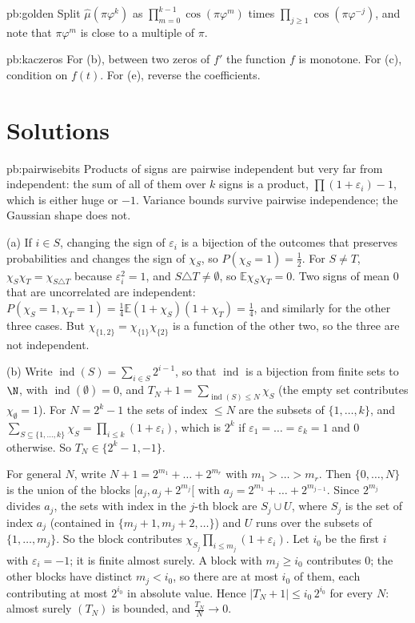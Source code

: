 \begin{hint}{pb:golden}
Split $\hat\mu(\pi\varphi^k)$ as $\prod_{m=0}^{k-1}\cos(\pi\varphi^m)$ times $\prod_{j\ge1}\cos(\pi\varphi^{-j})$, and note that $\pi\varphi^m$ is close to a multiple of $\pi$.
\end{hint}

\begin{hint}{pb:kaczeros}
For (b), between two zeros of $f'$ the function $f$ is monotone. For (c), condition on $f(t)$. For (e), reverse the coefficients.
\end{hint}

\section*{Solutions}

\begin{solution}{pb:pairwisebits}
\idea Products of signs are pairwise independent but very far from independent: the sum of all of them over $k$ signs is a product, $\prod(1+\varepsilon_i)-1$,
which is either huge or $-1$. Variance bounds survive pairwise independence; the Gaussian shape does not.

\writeup (a) If $i\in S$, changing the sign of $\varepsilon_i$ is a bijection of the outcomes that preserves probabilities and changes the sign of $\chi_S$, so
$P(\chi_S=1)=\frac12$. For $S\ne T$, $\chi_S\chi_T=\chi_{S\triangle T}$ because $\varepsilon_i^2=1$, and $S\triangle T\ne\emptyset$, so $\mathbb E\chi_S\chi_T=0$. Two signs of
mean $0$ that are uncorrelated are independent: $P(\chi_S=1,\chi_T=1)=\frac14\mathbb E(1+\chi_S)(1+\chi_T)=\frac14$, and similarly for the other three cases. But
$\chi_{\{1,2\}}=\chi_{\{1\}}\chi_{\{2\}}$ is a function of the other two, so the three are not independent.

(b) Write $\operatorname{ind}(S)=\sum_{i\in S}2^{i-1}$, so that $\operatorname{ind}$ is a bijection from finite sets to $\N$, with $\operatorname{ind}(\emptyset)=0$, and
$T_N+1=\sum_{\operatorname{ind}(S)\le N}\chi_S$ (the empty set contributes $\chi_\emptyset=1$). For $N=2^k-1$ the sets of index $\le N$ are the subsets of $\{1,\dots,k\}$, and
$\sum_{S\subseteq\{1,\dots,k\}}\chi_S=\prod_{i\le k}(1+\varepsilon_i)$, which is $2^k$ if $\varepsilon_1=\dots=\varepsilon_k=1$ and $0$ otherwise. So $T_N\in\{2^k-1,-1\}$.

For general $N$, write $N+1=2^{m_1}+\dots+2^{m_r}$ with $m_1>\dots>m_r$. Then $\{0,\dots,N\}$ is the union of the blocks $[a_j,a_j+2^{m_j}[$ with
$a_j=2^{m_1}+\dots+2^{m_{j-1}}$. Since $2^{m_j}$ divides $a_j$, the sets with index in the $j$-th block are $S_j\cup U$, where $S_j$ is the set of index $a_j$ (contained in
$\{m_j+1,m_j+2,\dots\}$) and $U$ runs over the subsets of $\{1,\dots,m_j\}$. So the block contributes $\chi_{S_j}\prod_{i\le m_j}(1+\varepsilon_i)$. Let $i_0$ be the first $i$
with $\varepsilon_i=-1$; it is finite almost surely. A block with $m_j\ge i_0$ contributes $0$; the other blocks have distinct $m_j<i_0$, so there are at most $i_0$ of them,
each contributing at most $2^{i_0}$ in absolute value. Hence $|T_N+1|\le i_0\,2^{i_0}$ for every $N$: almost surely $(T_N)$ is bounded, and $\frac{T_N}N\to0$.


\end{solution}
